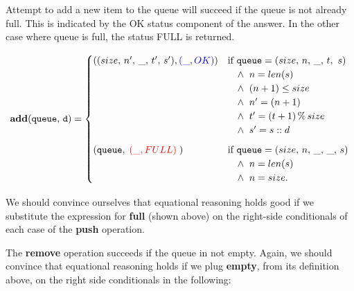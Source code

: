 \documentclass[10pt]{article}
\begin{document}
    Attempt to add a new item to the queue will succeed if the queue is not already full. This is indicated by the OK status component of the answer. In the other case where queue is full, the status FULL is returned.

    \[
        \mathtt{\mathbf{add}(queue,\, d)} = \begin{cases} ((size, \, n', \, \_, \, t', \, s'),  {\textcolor{blue}{(\_, OK)}}) & \mbox{if } \mathtt{queue} = (size, \, n, \, \_, \, t,\, \, s)\\ & \hspace*{10pt}\wedge\; \; n = len(s)
        \\ & \hspace*{10pt}\wedge\; \; (n+1) \leq size
        \\ & \hspace*{10pt}\wedge\; \; n' = (n+1) 
        \\ & \hspace*{10pt}\wedge\; \; t' = (t + 1) \,\%\, size 
        \\ & \hspace*{10pt}\wedge\; \; s' = s::d\vspace*{6pt}\\ 
        (\mathtt{queue},\;{\textcolor{red}{(\_, FULL)}} \; ) & \mbox{if } \mathtt{queue} = (size, \, n, \, \_, \, \_, \, s)\\
        & \hspace*{10pt}\wedge\; \; n = len(s)\\
        & \hspace*{10pt}\wedge\; \; n = size. \end{cases} 
    \]

    We should convince ourselves that equational reasoning holds good if we substitute the expression for \textbf{full} (shown above) on the right-side conditionals of each case of the \textbf{push} operation. 
  
    The \textbf{remove} operation succeeds if the queue in not empty. Again, we should convince that equational reasoning holds if we plug \textbf{empty}, from its definition above, on the right side conditionals in the following: 
\end{document}
